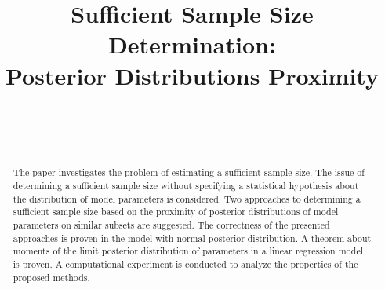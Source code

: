 \documentclass[
11pt,%
tightenlines,%
twoside,%
onecolumn,%
nofloats,%
nobibnotes,%
nofootinbib,%
superscriptaddress,%
noshowpacs,%
centertags]%
{revtex4-2}
\begin{document}

\title{Sufficient Sample Size Determination:\\ Posterior Distributions Proximity}

\author{~}

\author{~}




\begin{abstract} %
    The paper investigates the problem of estimating a sufficient sample size. The issue of determining a sufficient sample size without specifying a statistical hypothesis about the distribution of model parameters is considered. Two approaches to determining a sufficient sample size based on the proximity of posterior distributions of model parameters on similar subsets are suggested. The correctness of the presented approaches is proven in the model with normal posterior distribution. A theorem about moments of the limit posterior distribution of parameters in a linear regression model is proven. A computational experiment is conducted to analyze the properties of the proposed methods.
\end{abstract}


\end{document}

